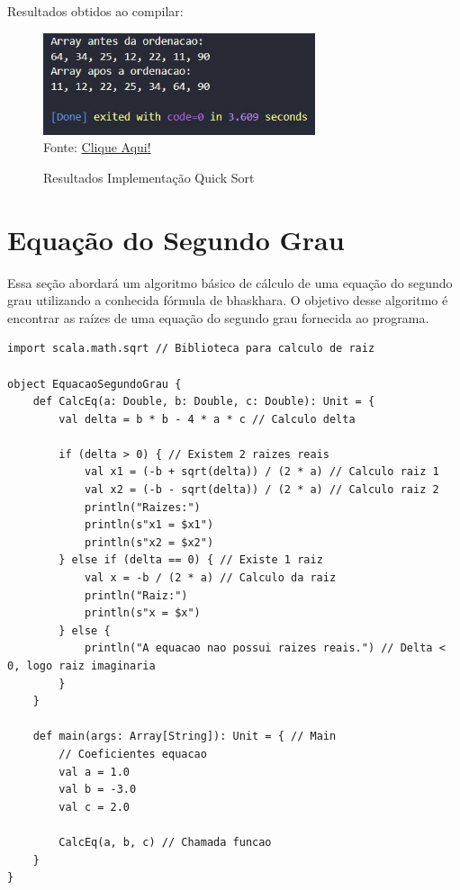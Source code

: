  	Resultados obtidos ao compilar:
 
 	\begin{figure}[H]
	 	\centering
	 	\caption{Resultados Implementação Quick Sort}
	 	\label{Resultados Implementação Quick Sort}
	 	\includegraphics[width=8cm]{Pictures/resQuick.jpg} \\
	 	Fonte: \href{https://stackoverflow.com/questions/67182087/scala-quicksort-algorithm-implementationi}{Clique Aqui!}
 	\end{figure}
 	
 	\section{Equação do Segundo Grau}
 	
 	Essa seção abordará um algoritmo básico de cálculo de uma equação do segundo grau utilizando a conhecida fórmula de bhaskhara. O objetivo desse algoritmo é encontrar as raízes de uma equação do segundo grau fornecida ao programa.
 	
 	\begin{lstlisting}[breaklines]
import scala.math.sqrt // Biblioteca para calculo de raiz

object EquacaoSegundoGrau {
	def CalcEq(a: Double, b: Double, c: Double): Unit = { 
		val delta = b * b - 4 * a * c // Calculo delta
		
		if (delta > 0) { // Existem 2 raizes reais
			val x1 = (-b + sqrt(delta)) / (2 * a) // Calculo raiz 1
			val x2 = (-b - sqrt(delta)) / (2 * a) // Calculo raiz 2
			println("Raizes:")
			println(s"x1 = $x1")
			println(s"x2 = $x2")
		} else if (delta == 0) { // Existe 1 raiz
			val x = -b / (2 * a) // Calculo da raiz
			println("Raiz:")
			println(s"x = $x")
		} else {
			println("A equacao nao possui raizes reais.") // Delta < 0, logo raiz imaginaria
		}
	}
	
	def main(args: Array[String]): Unit = { // Main
		// Coeficientes equacao
		val a = 1.0
		val b = -3.0
		val c = 2.0
		
		CalcEq(a, b, c) // Chamada funcao
	}
}
 	\end{lstlisting}  
 
